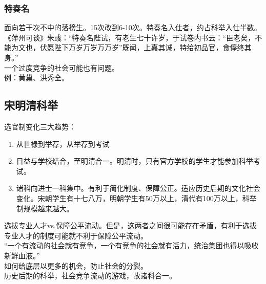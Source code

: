 \documentclass[twoside]{article}
\begin{document}
\subsubsection{特奏名}
面向若干次不中的落榜生。15次改到6-10次。特奏名入仕者，约占科举入仕半数。\\
《萍州可谈》朱彧：``特奏名陛试，有老生七十许岁，于试卷内书云：``臣老矣，不能为文也，伏愿陛下万岁万岁万万岁''既闻，上嘉其诚，特给初品官，食俸终其身。''\\
一个过度竞争的社会可能也有问题。\\
例：黄巢、洪秀全。
\subsection{宋明清科举}
选官制变化三大趋势：
\begin{enumerate}
	\item 从世禄到举荐，从举荐到考试
	\item 日益与学校结合，至明清合一。明清时，只有官方学校的学生才能参加科举考试。
	\item 诸科向进士一科集中。有利于简化制度、保障公正。适应历史后期的文化社会变化。宋朝学生有十七八万，明朝学生有50万以上，清代有100万以上，科举制规模越来越大。
\end{enumerate}
选拔专业人才vs.保障公平流动。但是，这两者之间很可能存在矛盾，有利于选拔专业人才的制度可能就不利于保障公平流动。\\
``一个有流动的社会就有竞争，一个有竞争的社会就有活力，统治集团也得以吸收新鲜血液。''\\
如何给底层以更多的机会，防止社会的分裂。\\
历史后期的科举，社会竞争流动的游戏，故诸科合一。
\end{document}
